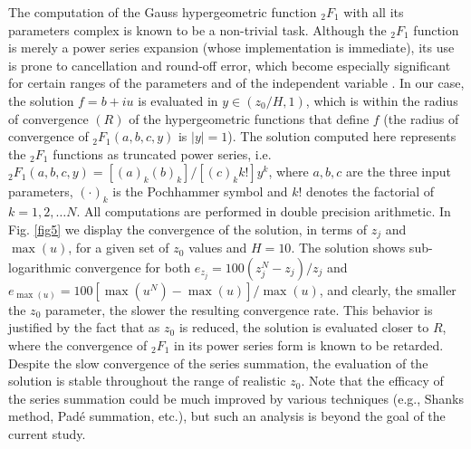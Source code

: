 %
The computation of the Gauss hypergeometric function $_2F_1$ with all its parameters complex is known to be a non-trivial task. Although the $_2F_1$ function is merely a power series expansion (whose implementation is immediate), its use is prone to cancellation and round-off error, which become especially significant for certain ranges of the parameters and of the independent variable \citep{temme2007}.
In our case, the solution $f = b+iu$ is evaluated in $y \in (z_0 / H, 1)$, which is within the radius of convergence $(R)$ of the hypergeometric functions that define $f$ (the radius of convergence of $_2F_1(a,b,c,y)$ is $|y|=1$). 
The solution computed here represents the $_2F_1$ functions as truncated power series, i.e. $_2F_1(a,b,c,y) = [(a)_k(b)_k]/[(c)_k k!] y^k$, where $a,b,c$ are the three input parameters, $(\cdot)_k$ is the Pochhammer symbol and $k!$ denotes the factorial of $k=1,2,\dots N$. 
All computations are performed in double precision arithmetic.
In Fig. \ref{fig5} we display the convergence of the solution, in terms of $z_j$ and $\max{(u)}$, for a given set of $z_0$ values and $H =10$. 
The solution shows sub-logarithmic convergence for both $e_{z_j} = 100(z^N_j-z_j)/z_j$ and $e_{\max{(u)}} = 100[\max{(u^N)}-\max{(u)}]/\max{(u)}$, and clearly, the smaller the $z_0$ parameter, the slower the resulting convergence rate. 
This behavior is justified by the fact that as $z_0$ is reduced, the solution is evaluated closer to $R$, where the convergence of $_2F_1$ in its power series form is known to be retarded.
Despite the slow convergence of the series summation, the evaluation of the solution is stable throughout the range of realistic $z_0$.
Note that the efficacy of the series summation could be much improved by various techniques (e.g., Shanks method, Pad\'e summation, etc.), but such an analysis is beyond the goal of the current study.





